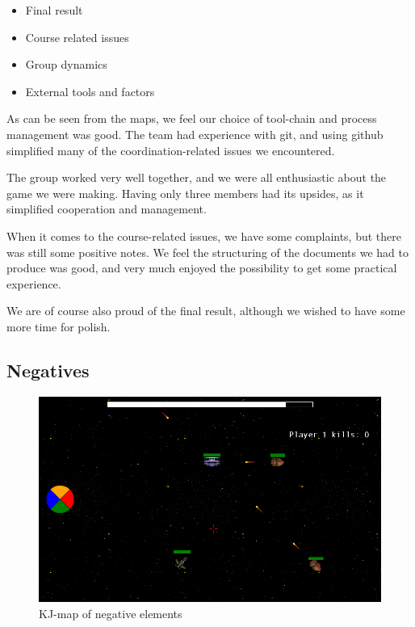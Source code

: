 \documentclass[titlepage,a4paper,11pt]{article}
\begin{document}
\begin{itemize}
    \item Final result
    \item Course related issues
    \item Group dynamics
    \item External tools and factors
\end{itemize}

As can be seen from the maps, we feel our choice of tool-chain and
process management was good. The team had experience with git, and using
github simplified many of the coordination-related issues we encountered.

The group worked very well together, and we were all enthusiastic about
the game we were making. Having only three members had its upsides, as it
simplified cooperation and management.

When it comes to the course-related issues, we have some complaints, but
there was still some positive notes.  We feel the structuring of the
documents we had to produce was good, and very much enjoyed the possibility
to get some practical experience.

We are of course also proud of the final result, although we wished to
have some more time for polish.

\subsection{Negatives}
\begin{figure}
    \begin{center}
    \includegraphics[width=\linewidth]{graphics/ingame}
    \caption{KJ-map of negative elements}
    \label{fig:negkjmap}
    \end{center}
\end{figure}
\end{document}
